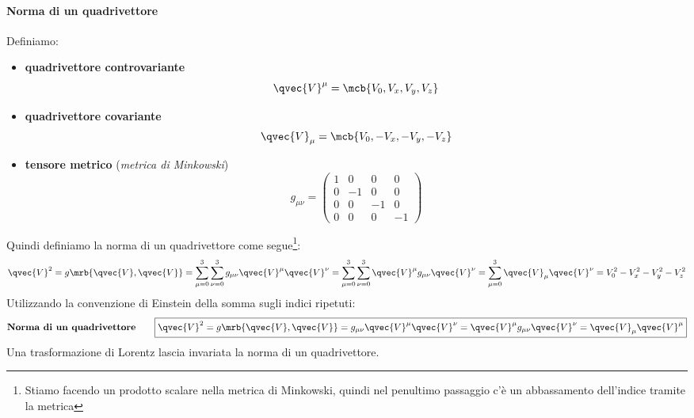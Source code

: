 \paragraph{Norma di un quadrivettore} Definiamo:
\begin{itemize}
  \item \textbf{quadrivettore controvariante}
    \begin{equation}
      \qvec{V}^{\mu} = \mcb{V_0, V_x, V_y, V_z}
    \end{equation}
  \item \textbf{quadrivettore covariante}
    \begin{equation}
      \qvec{V}_{\mu} = \mcb{V_0, -V_x, -V_y, -V_z}
    \end{equation}
  \item \textbf{tensore metrico} (\textit{metrica di Minkowski})
    \begin{equation}
      g_{\mu\nu} =
      \begin{pmatrix}
        1 & 0  & 0  & 0 \\
        0 & -1 & 0  & 0 \\
        0 & 0  & -1 & 0 \\
        0 & 0  & 0  & -1
      \end{pmatrix}
    \end{equation}
\end{itemize}
Quindi definiamo la norma di un quadrivettore come segue\footnote{
  Stiamo facendo un prodotto scalare nella metrica di Minkowski, quindi nel
  penultimo passaggio c'è un abbassamento dell'indice tramite la metrica
}:
\begin{equation}
  \qvec{V}^2 
  = g \mrb{\qvec{V}, \qvec{V}}
  = \sum_{\mu=0}^3\sum_{\nu=0}^3 g_{\mu\nu} \qvec{V}^\mu \qvec{V}^\nu
  = \sum_{\mu=0}^3\sum_{\nu=0}^3 \qvec{V}^\mu g_{\mu\nu} \qvec{V}^\nu
  = \sum_{\mu=0}^3 \qvec{V}_\mu \qvec{V}^\nu
  = V_0^2 - V_x^2 - V_y^2 - V_z^2
\end{equation}
Utilizzando la convenzione di Einstein della somma sugli indici ripetuti:
\begin{align}
  \textbf{Norma di un quadrivettore}
  \qquad
  \boxed{
    \qvec{V}^2
    = g \mrb{\qvec{V}, \qvec{V}}
    = g_{\mu\nu}\qvec{V}^\mu \qvec{V}^\nu
    = \qvec{V}^\mu g_{\mu\nu} \qvec{V}^\nu
    = \qvec{V}_\mu \qvec{V}^\mu 
  }
\end{align}
Una trasformazione di Lorentz lascia invariata la norma di un quadrivettore.

